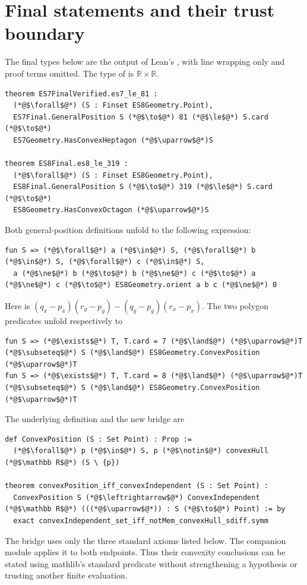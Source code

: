 \section{Final statements and their trust boundary}\label{app:statements}
The final types below are the output of Lean's , with
line wrapping only and proof terms omitted. The type of 
is $\mathbb R\times\mathbb R$.
\begin{lstlisting}
theorem ES7FinalVerified.es7_le_81 :
  (*@$\forall$@*) (S : Finset ES8Geometry.Point),
  ES7Final.GeneralPosition S (*@$\to$@*) 81 (*@$\le$@*) S.card (*@$\to$@*)
  ES7Geometry.HasConvexHeptagon (*@$\uparrow$@*)S

theorem ES8Final.es8_le_319 :
  (*@$\forall$@*) (S : Finset ES8Geometry.Point),
  ES8Final.GeneralPosition S (*@$\to$@*) 319 (*@$\le$@*) S.card (*@$\to$@*)
  ES8Geometry.HasConvexOctagon (*@$\uparrow$@*)S
\end{lstlisting}
Both general-position definitions unfold to the following expression:
\begin{lstlisting}
fun S => (*@$\forall$@*) a (*@$\in$@*) S, (*@$\forall$@*) b (*@$\in$@*) S, (*@$\forall$@*) c (*@$\in$@*) S,
  a (*@$\ne$@*) b (*@$\to$@*) b (*@$\ne$@*) c (*@$\to$@*) a (*@$\ne$@*) c (*@$\to$@*) ES8Geometry.orient a b c (*@$\ne$@*) 0
\end{lstlisting}
Here  is
$(q_x-p_x)(r_y-p_y)-(q_y-p_y)(r_x-p_x)$. The two polygon predicates
unfold respectively to
\begin{lstlisting}
fun S => (*@$\exists$@*) T, T.card = 7 (*@$\land$@*) (*@$\uparrow$@*)T (*@$\subseteq$@*) S (*@$\land$@*) ES8Geometry.ConvexPosition (*@$\uparrow$@*)T
fun S => (*@$\exists$@*) T, T.card = 8 (*@$\land$@*) (*@$\uparrow$@*)T (*@$\subseteq$@*) S (*@$\land$@*) ES8Geometry.ConvexPosition (*@$\uparrow$@*)T
\end{lstlisting}
The underlying definition and the new bridge are
\begin{lstlisting}
def ConvexPosition (S : Set Point) : Prop :=
  (*@$\forall$@*) p (*@$\in$@*) S, p (*@$\notin$@*) convexHull (*@$\mathbb R$@*) (S \ {p})

theorem convexPosition_iff_convexIndependent (S : Set Point) :
  ConvexPosition S (*@$\leftrightarrow$@*) ConvexIndependent (*@$\mathbb R$@*) (((*@$\uparrow$@*)) : S (*@$\to$@*) Point) := by
  exact convexIndependent_set_iff_notMem_convexHull_sdiff.symm
\end{lstlisting}
The bridge uses only the three standard axioms listed below. The
companion module applies it to both endpoints. Thus their convexity
conclusions can be stated using mathlib's standard predicate without
strengthening a hypothesis or trusting another finite evaluation.


